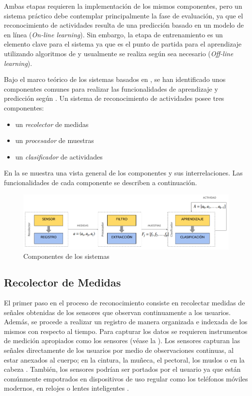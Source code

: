 Ambas etapas requieren la implementación de los mismos componentes,
pero un sistema  práctico debe contemplar principalmente
la fase de evaluación, ya que el reconocimiento de actividades resulta
de una predicción basado en un modelo de  en línea (\emph{On-line
learning}). Sin embargo, la etapa de entrenamiento es un elemento
clave para el sistema ya que es el punto de partida para el aprendizaje
utilizando algoritmos de  y usualmente se realiza según
sea necesario (\emph{Off-line learning}).

Bajo el marco teórico de los sistemas  basados en ,
se han identificado unos componentes comunes para realizar las funcionalidades
de aprendizaje y predicción según \cite{Choudhury2008}. Un sistema
de reconocimiento de actividades posee tres componentes:
\begin{itemize}
\item un \emph{recolector }de medidas
\item un\emph{ procesador }de muestras 
\item un \emph{clasificador }de actividades
\end{itemize}
En la  se muestra una vista general
de los componentes y sus interrelaciones. Las funcionalidades de cada
componente se describen a continuación. 

\begin{figure}[!tbph]
\centering{}\includegraphics[width=1\columnwidth,width=1\linewidth]{capitulo-4/graphics/harlearning}\caption[Componentes HAR]{\label{fig4:componentes-har}Componentes de los sistemas }
\end{figure}


\subsection{Recolector de Medidas}

\label{sec43:recolector-datos}El primer paso en el proceso de reconocimiento
consiste en recolectar medidas de señales obtenidas de los sensores
que observan continuamente a los usuarios. Además, se procede a realizar
un registro de manera organizada e indexada de los mismos con respecto
al tiempo. Para capturar los datos se requieren instrumentos de medición
apropiados como los sensores (véase la ).
Los sensores capturan las señales directamente de los usuarios por
medio de observaciones continuas, al estar anexados al cuerpo; en
la cintura, la muñeca, el pectoral, los muslos o en la cabeza \cite{Bao2004}.
También, los sensores podrían ser portados por el usuario ya que están
comúnmente empotrados en dispositivos de uso regular como los teléfonos
móviles modernos, en relojes o lentes inteligentes \cite{LaraLabrador2012,Choudhury2008}.

